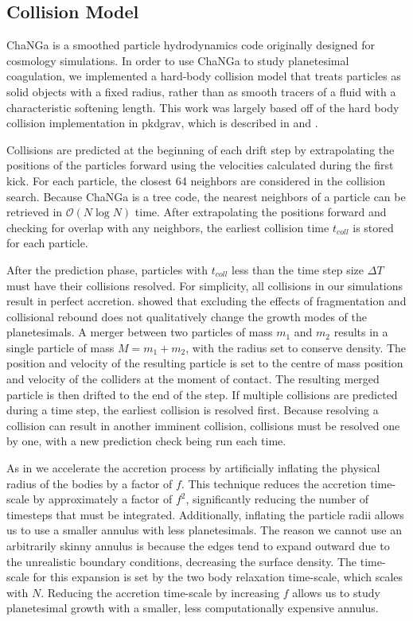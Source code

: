 \subsection{Collision Model} \label{sec:collModel}

{\sc ChaNGa} is a smoothed particle hydrodynamics code originally designed for cosmology simulations. In order to use 
{\sc ChaNGa} to study planetesimal coagulation, we implemented a hard-body collision model that treats particles as solid 
objects with a fixed radius, rather than as smooth tracers of a fluid with a characteristic softening length. This work was largely 
based off of the hard body collision implementation in {\sc pkdgrav}, which is described in \cite{richardson94} and 
\cite{richardson00}.

Collisions are predicted at the beginning of each drift step by extrapolating the positions of the particles forward using the 
velocities calculated during the first kick. For each particle, the closest 64 neighbors are considered in the collision search. 
Because {\sc ChaNGa} is a tree code, the nearest neighbors of a particle can be retrieved in $\mathcal{O}(N\log{}N)$ time. After 
extrapolating the positions forward and checking for overlap with any neighbors, the earliest collision time $t_{coll}$ is stored for 
each particle.

After the prediction phase, particles with $t_{coll}$ less than the time step size $\Delta T$ must have their collisions resolved. For 
simplicity, all collisions in our simulations result in perfect accretion. \cite{ida93} showed that excluding the effects of 
fragmentation and collisional rebound does not qualitatively change the growth modes of the planetesimals. A merger between 
two particles of mass $m_{1}$ and $m_{2}$ results in a single particle of mass $M = m_{1} + m_{2}$, with the radius set to 
conserve density. The position and velocity of the resulting particle is set to the centre of mass position and velocity of the 
colliders at the moment of contact. The resulting merged particle is then drifted to the end of the step. If multiple collisions are 
predicted during a time step, the earliest collision is resolved first. Because resolving a collision can result in another imminent 
collision, collisions must be resolved one by one, with a new prediction check being run each time.

As in \cite{kokubo96, kokubo98} we accelerate the accretion process by artificially inflating the physical radius of the bodies by 
a factor of $f$. This technique reduces the accretion time-scale by approximately a factor of $f^{2}$, significantly reducing the 
number of timesteps that must be integrated. Additionally, inflating the particle radii allows us to use a smaller annulus with less 
planetesimals. The reason we cannot use an arbitrarily skinny annulus is because the edges tend to expand outward due to the 
unrealistic boundary conditions, decreasing the surface density. The time-scale for this expansion is set by the two body 
relaxation time-scale, which scales with $N$. Reducing the accretion time-scale by increasing $f$ allows us to study 
planetesimal growth with a smaller, less computationally expensive annulus.

